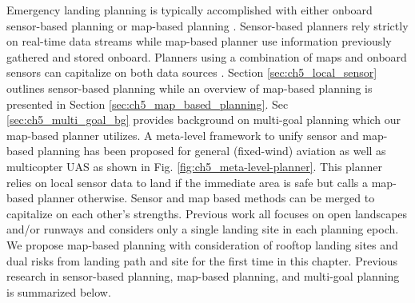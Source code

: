 Emergency landing planning is typically accomplished with either onboard sensor-based planning or map-based planning \cite{warren_enabling_2015, ten_harmsel_emergency_2017}.  Sensor-based planners rely strictly on real-time data streams while map-based planner use information previously gathered and stored onboard. Planners using a combination of maps and onboard sensors can capitalize on both data sources \cite{ten_harmsel_emergency_2017}.  Section \ref{sec:ch5_local_sensor} outlines sensor-based planning while an overview of map-based planning is presented in Section \ref{sec:ch5_map_based_planning}. Sec \ref{sec:ch5_multi_goal_bg} provides background on multi-goal planning which our map-based planner utilizes. A meta-level framework to unify sensor and map-based planning has been proposed for general (fixed-wind) aviation \cite{atkins_emergency_2006} as well as multicopter \ac{UAS} \cite{ten_harmsel_emergency_2017} as shown in Fig. \ref{fig:ch5_meta-level-planner}. This planner relies on local sensor data to land if the immediate area is safe but calls a map-based planner otherwise. Sensor and map based methods can be merged to capitalize on each other's strengths. Previous work all focuses on open landscapes and/or runways and considers only a single landing site in each planning epoch. We propose map-based planning with consideration of rooftop landing sites and dual risks from landing path and site for the first time in this chapter.  Previous research in sensor-based planning, map-based planning, and multi-goal planning is summarized below.
